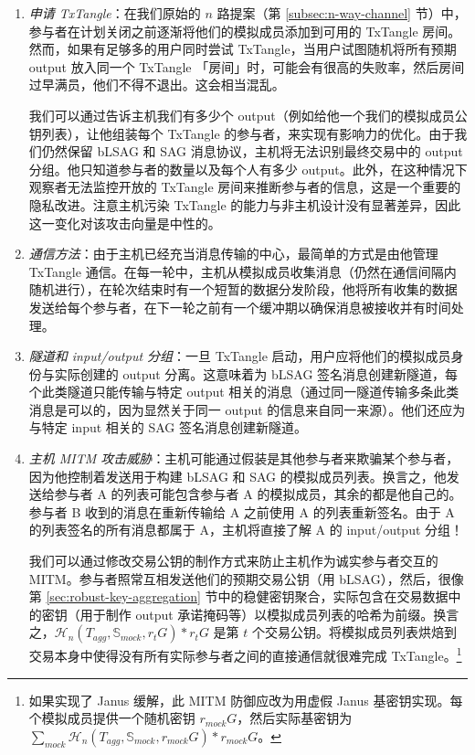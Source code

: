 \begin{enumerate}
    \item {\em 申请 TxTangle}：在我们原始的 $n$ 路提案（第 \ref{subsec:n-way-channel} 节）中，参与者在计划关闭之前逐渐将他们的模拟成员添加到可用的 TxTangle 房间。然而，如果有足够多的用户同时尝试 TxTangle，当用户试图随机将所有预期 output 放入同一个 TxTangle 「房间」时，可能会有很高的失败率，然后房间过早满员，他们不得不退出。这会相当混乱。

    我们可以通过告诉主机我们有多少个 output（例如给他一个我们的模拟成员公钥列表），让他组装每个 TxTangle 的参与者，来实现有影响力的优化。由于我们仍然保留 bLSAG 和 SAG 消息协议，主机将无法识别最终交易中的 output 分组。他只知道参与者的数量以及每个人有多少 output。此外，在这种情况下观察者无法监控开放的 TxTangle 房间来推断参与者的信息，这是一个重要的隐私改进。注意主机污染 TxTangle 的能力与非主机设计没有显著差异，因此这一变化对该攻击向量是中性的。

    \item {\em 通信方法}：由于主机已经充当消息传输的中心，最简单的方式是由他管理 TxTangle 通信。在每一轮中，主机从模拟成员收集消息（仍然在通信间隔内随机进行），在轮次结束时有一个短暂的数据分发阶段，他将所有收集的数据发送给每个参与者，在下一轮之前有一个缓冲期以确保消息被接收并有时间处理。

    \item {\em 隧道和 input/output 分组}：一旦 TxTangle 启动，用户应将他们的模拟成员身份与实际创建的 output 分离。这意味着为 bLSAG 签名消息创建新隧道，每个此类隧道只能传输与特定 output 相关的消息（通过同一隧道传输多条此类消息是可以的，因为显然关于同一 output 的信息来自同一来源）。他们还应为与特定 input 相关的 SAG 签名消息创建新隧道。

    \item {\em 主机 MITM 攻击威胁}：主机可能通过假装是其他参与者来欺骗某个参与者，因为他控制着发送用于构建 bLSAG 和 SAG 的模拟成员列表。换言之，他发送给参与者 A 的列表可能包含参与者 A 的模拟成员，其余的都是他自己的。参与者 B 收到的消息在重新传输给 A 之前使用 A 的列表重新签名。由于 A 的列表签名的所有消息都属于 A，主机将直接了解 A 的 input/output 分组！

    我们可以通过修改交易公钥的制作方式来防止主机作为诚实参与者交互的 MITM。参与者照常互相发送他们的预期交易公钥（用 bLSAG），然后，很像第 \ref{sec:robust-key-aggregation} 节中的稳健密钥聚合，实际包含在交易数据中的密钥（用于制作 output 承诺掩码等）以模拟成员列表的哈希为前缀。换言之，$\mathcal{H}_n(T_{agg},\mathbb{S}_{mock},r_t G)*r_t G$ 是第 $t$ 个交易公钥。将模拟成员列表烘焙到交易本身中使得没有所有实际参与者之间的直接通信就很难完成 TxTangle。\footnote{如果实现了 Janus 缓解，此 MITM 防御应改为用虚假 Janus 基密钥实现。每个模拟成员提供一个随机密钥 $r_{mock} G$，然后实际基密钥为 $\sum_{mock} \mathcal{H}_n(T_{agg},\mathbb{S}_{mock},r_{mock} G)*r_{mock} G$。}
\end{enumerate}{}


